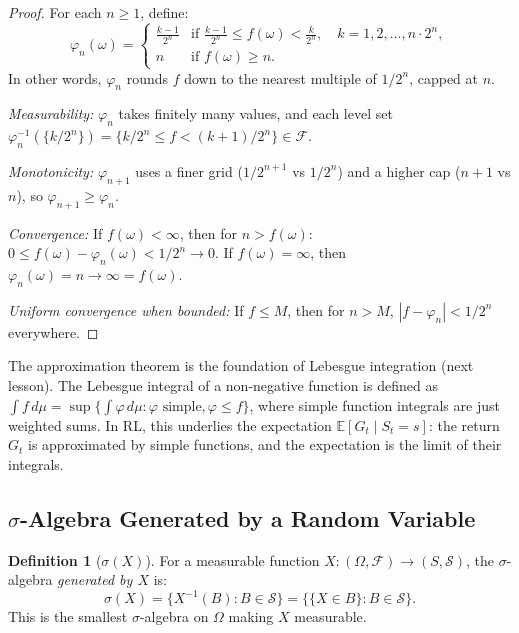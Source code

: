 \documentclass[11pt,a4paper]{article}
\theoremstyle{definition}
\newtheorem{definition}{Definition}[section]
\theoremstyle{plain}
\theoremstyle{remark}
\newcommand{\E}{\mathbb{E}}
\begin{document}
\begin{proof}
For each $n \geq 1$, define:
\begin{equation}
    \varphi_n(\omega) = \begin{cases}
        \frac{k-1}{2^n} & \text{if } \frac{k-1}{2^n} \leq f(\omega) < \frac{k}{2^n}, \quad k = 1, 2, \ldots, n \cdot 2^n,\\[4pt]
        n & \text{if } f(\omega) \geq n.
    \end{cases}
    \label{eq:approx_construction}
\end{equation}
In other words, $\varphi_n$ rounds $f$ down to the nearest multiple of $1/2^n$,
capped at $n$.

\textit{Measurability:} $\varphi_n$ takes finitely many values, and each level set
$\varphi_n^{-1}(\{k/2^n\}) = \{k/2^n \leq f < (k+1)/2^n\} \in \mathcal{F}$.

\textit{Monotonicity:} $\varphi_{n+1}$ uses a finer grid ($1/2^{n+1}$ vs $1/2^n$)
and a higher cap ($n+1$ vs $n$), so $\varphi_{n+1} \geq \varphi_n$.

\textit{Convergence:} If $f(\omega) < \infty$, then for $n > f(\omega)$:
$0 \leq f(\omega) - \varphi_n(\omega) < 1/2^n \to 0$.
If $f(\omega) = \infty$, then $\varphi_n(\omega) = n \to \infty = f(\omega)$.

\textit{Uniform convergence when bounded:} If $f \leq M$, then for $n > M$,
$|f - \varphi_n| < 1/2^n$ everywhere.
\end{proof}

\begin{rlconnection}[Connection to RL]
The approximation theorem is the foundation of Lebesgue integration (next lesson).
The Lebesgue integral of a non-negative function is defined as
$\int f\,d\mu = \sup\{\int \varphi\,d\mu : \varphi \text{ simple}, \varphi \leq f\}$,
where simple function integrals are just weighted sums. In RL, this underlies
the expectation $\E[G_t \mid S_t = s]$: the return $G_t$ is approximated by
simple functions, and the expectation is the limit of their integrals.
\end{rlconnection}

\subsection{$\sigma$-Algebra Generated by a Random Variable}
\label{subsec:sigma_rv}

\begin{definition}[$\sigma(X)$]
\label{def:sigma_x}
For a measurable function $X: (\Omega, \mathcal{F}) \to (S, \mathcal{S})$, the
$\sigma$-algebra \emph{generated by $X$} is:
\begin{equation}
    \sigma(X) = \{X^{-1}(B) : B \in \mathcal{S}\} = \{\{X \in B\} : B \in \mathcal{S}\}.
\end{equation}
This is the smallest $\sigma$-algebra on $\Omega$ making $X$ measurable.
\end{definition}
\end{document}
